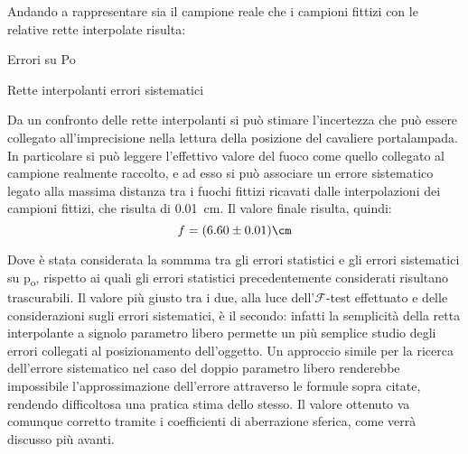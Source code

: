 Andando a rappresentare sia il campione reale che i campioni fittizi con le relative rette interpolate risulta:
\begin{grafico} \centering  \caption{Errori su Po} \label{gr:02_graph_4.tex} \end{grafico}
\begin{tabella}
	\centering
	
	\caption{Rette interpolanti errori sistematici}
	\label{tab:02tab6}
\end{tabella}
Da un confronto delle rette interpolanti si può stimare l'incertezza che può essere collegato all'imprecisione nella lettura della
 posizione del cavaliere portalampada. In particolare si può leggere l'effettivo valore del fuoco come quello collegato al
 campione realmente raccolto, e ad esso si può associare un errore sistematico legato alla massima distanza tra i fuochi fittizi
 ricavati dalle interpolazioni dei campioni fittizi, che risulta di 0.01~cm. Il valore finale risulta, quindi:
\[f = (6.60 \pm 0.01) \cm\]

Dove è stata considerata la sommma tra gli errori statistici e gli errori sistematici su p\textsubscript{o}, rispetto ai quali gli
 errori statistici precedentemente considerati risultano trascurabili.
 Il valore più giusto tra i due, alla luce dell'$\mathcal{F}$-test effettuato e delle considerazioni sugli errori sistematici, è il secondo:
 infatti la semplicità della retta interpolante a signolo parametro libero permette un più semplice studio degli errori collegati
 al posizionamento dell'oggetto. Un approccio simile per la ricerca dell'errore sistematico nel caso del doppio parametro libero
 renderebbe impossibile l'approssimazione dell'errore attraverso le formule sopra citate, rendendo difficoltosa una pratica stima
 dello stesso. Il valore ottenuto va comunque corretto tramite i coefficienti di aberrazione sferica, come verrà discusso più avanti.
